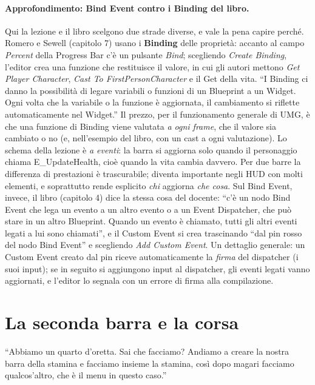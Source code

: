 \paragraph{Approfondimento: Bind Event contro i Binding del libro.} Qui la lezione e il
libro scelgono due strade diverse, e vale la pena capire perché. Romero e Sewell
(capitolo 7) usano i \textbf{Binding} delle proprietà: accanto al campo \emph{Percent}
della Progress Bar c'è un pulsante \emph{Bind}; scegliendo \emph{Create Binding}, l'editor
crea una funzione che restituisce il valore, in cui gli autori mettono \emph{Get Player
Character}, \emph{Cast To FirstPersonCharacter} e il Get della vita. ``I Binding ci danno
la possibilità di legare variabili o funzioni di un Blueprint a un Widget. Ogni volta che
la variabile o la funzione è aggiornata, il cambiamento si riflette automaticamente nel
Widget.'' Il prezzo, per il funzionamento generale di UMG, è che una funzione di Binding
viene valutata \emph{a ogni frame}, che il valore sia cambiato o no (e, nell'esempio del
libro, con un cast a ogni valutazione). Lo schema della lezione è \emph{a eventi}: la barra
si aggiorna solo quando il personaggio chiama E\_UpdateHealth, cioè quando la vita cambia
davvero. Per due barre la differenza di prestazioni è trascurabile; diventa importante
negli HUD con molti elementi, e soprattutto rende esplicito \emph{chi} aggiorna \emph{che
cosa}. Sul Bind Event, invece, il libro (capitolo 4) dice la stessa cosa del docente:
``c'è un nodo Bind Event che lega un evento a un altro evento o a un Event Dispatcher, che
può stare in un altro Blueprint. Quando un evento è chiamato, tutti gli altri eventi legati
a lui sono chiamati'', e il Custom Event si crea trascinando ``dal pin rosso del nodo Bind
Event'' e scegliendo \emph{Add Custom Event}. Un dettaglio generale: un Custom Event creato
dal pin riceve automaticamente la \emph{firma} del dispatcher (i suoi input); se in seguito
si aggiungono input al dispatcher, gli eventi legati vanno aggiornati, e l'editor lo segnala
con un errore di firma alla compilazione.

\section{La seconda barra e la corsa}
\label{ue11:sec:corsa}

``Abbiamo un quarto d'oretta. Sai che facciamo? Andiamo a creare la nostra barra della
stamina e facciamo insieme la stamina, così dopo magari facciamo qualcos'altro, che è il
menu in questo caso.''

